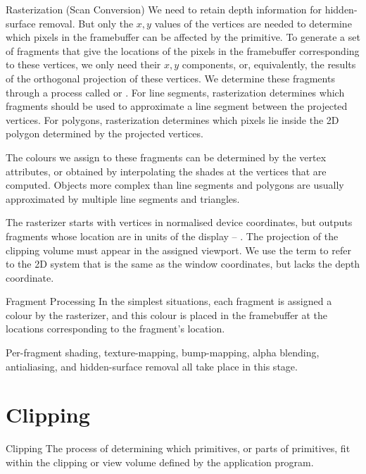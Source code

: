 \documentclass[../COS3712_Notes.tex]{subfiles}
\begin{document}
      \begin{definition}{Rasterization (Scan Conversion)}
        We need to retain depth information for hidden-surface removal.
        But only the $x, y$ values of the vertices are needed to determine which pixels
        in the framebuffer can be affected by the primitive.
        To generate a set of fragments that give the locations of the pixels in the framebuffer
        corresponding to these vertices, we only need their $x, y$ components,
        or, equivalently, the results of the orthogonal projection of these vertices.
        We determine these fragments through a process called 
        or .
        For line segments, rasterization determines which fragments should be used to approximate
        a line segment between the projected vertices.
        For polygons, rasterization determines which pixels lie inside the 2D polygon
        determined by the projected vertices.

        The colours we assign to these fragments can be determined by the vertex attributes,
        or obtained by interpolating the shades at the vertices that are computed.
        Objects more complex than line segments and polygons are usually approximated
        by multiple line segments and triangles.

        The rasterizer starts with vertices in normalised device coordinates,
        but outputs fragments whose location are in units of the display
        -- .
        The projection of the clipping volume must appear in the assigned viewport.
        We use the term  to refer to the 2D system that is the same
        as the window coordinates, but lacks the depth coordinate.
      \end{definition}

      \begin{definition}{Fragment Processing}
        In the simplest situations, each fragment is assigned a colour by the rasterizer,
        and this colour is placed in the framebuffer at the locations corresponding to the
        fragment's location.

        Per-fragment shading, texture-mapping, bump-mapping, alpha blending,
        antialiasing, and hidden-surface removal all take place in this stage.
      \end{definition}

    \section{Clipping}
      \begin{definition}{Clipping}
        The process of determining which primitives, or parts of primitives,
        fit within the clipping or view volume defined by the application program.
      \end{definition}
\end{document}
